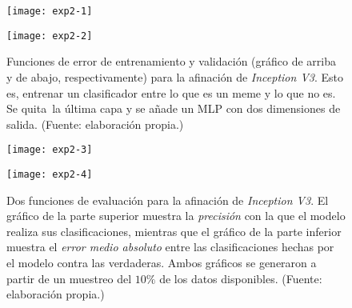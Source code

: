\begin{figure}[h]
  \begin{minipage}[c]{\linewidth}
    \texttt{[image: exp2-1]}
  \end{minipage}\hfill
  \begin{minipage}[c]{\linewidth}
    \texttt{[image: exp2-2]}
  \end{minipage}
  \caption{
    Funciones de error de entrenamiento y validación (gráfico de arriba y de abajo,
    respectivamente) para la afinación de \emph{Inception V3}.
    Esto es, entrenar un clasificador entre lo que es un meme y lo que no es. Se quita\
    la última capa y se añade un MLP con dos dimensiones de salida.
    (Fuente: elaboración propia.)
  }
  \label{exp2}
\end{figure}

\begin{figure}[H]
  \centering
  \begin{minipage}[c]{\linewidth}
    \texttt{[image: exp2-3]}
  \end{minipage}\hfill
  \begin{minipage}[c]{\linewidth}
    \texttt{[image: exp2-4]}
  \end{minipage}
  \caption{
    Dos funciones de evaluación para la afinación de \emph{Inception V3}.
    El gráfico de la parte superior muestra la \emph{precisión} con la que el modelo realiza
    sus clasificaciones, mientras que el gráfico de la parte inferior muestra el
    \emph{error medio absoluto} entre las clasificaciones hechas por el modelo contra las verdaderas.
    Ambos gráficos se generaron a partir de un muestreo del $10\%$ de los datos disponibles.
    (Fuente: elaboración propia.)
  }
  \label{eval:exp2}
\end{figure}

